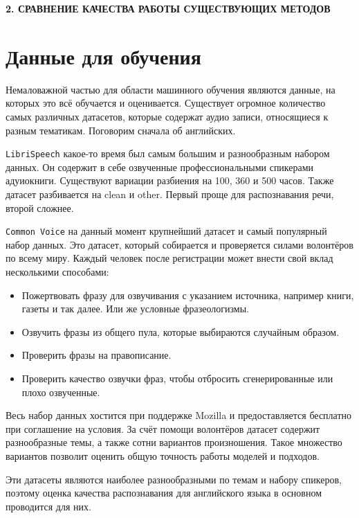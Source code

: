 \newpage
\begin{center}
  \textbf{\large 2. СРАВНЕНИЕ КАЧЕСТВА РАБОТЫ СУЩЕСТВУЮЩИХ МЕТОДОВ}
\end{center}

\section{Данные для обучения}

Немаловажной частью для области машинного обучения являются данные, на которых это всё обучается и оценивается.
Существует огромное количество самых различных датасетов, которые содержат аудио записи, относящиеся  к разным тематикам.
Поговорим сначала об английских.

\texttt{LibriSpeech} какое-то время был самым большим и разнообразным набором данных.
Он содержит в себе озвученные профессиональными спикерами адуиокниги.
Существуют вариации разбиения на 100, 360 и 500 часов.
Также датасет разбивается на clean и other.
Первый проще для распознавания речи, второй сложнее.

\texttt{Common Voice} на данный момент крупнейший датасет и самый популярный набор данных.
Это датасет, который собирается и проверяется силами волонтёров по всему миру.
Каждый человек после регистрации может  внести свой вклад несколькими способами:
\begin{itemize}
  \item Пожертвовать фразу для озвучивания с указанием источника, например книги, газеты и так далее.
    Или же условные фразеологизмы.
  \item Озвучить фразы из общего пула, которые выбираются случайным образом.
  \item Проверить фразы на правописание.
  \item Проверить качество озвучки фраз, чтобы отбросить сгенерированные или плохо озвученные.
\end{itemize}
Весь набор данных хостится при поддержке Mozilla и предоставляется бесплатно при соглашение на условия.
За счёт помощи волонтёров датасет содержит разнообразные темы, а также сотни вариантов произношения.
Такое множество вариантов позволит оценить общую точность работы моделей и подходов.

Эти датасеты являются наиболее разнообразными по темам и набору спикеров, поэтому оценка качества распознавания для английского языка в основном проводится для них.

